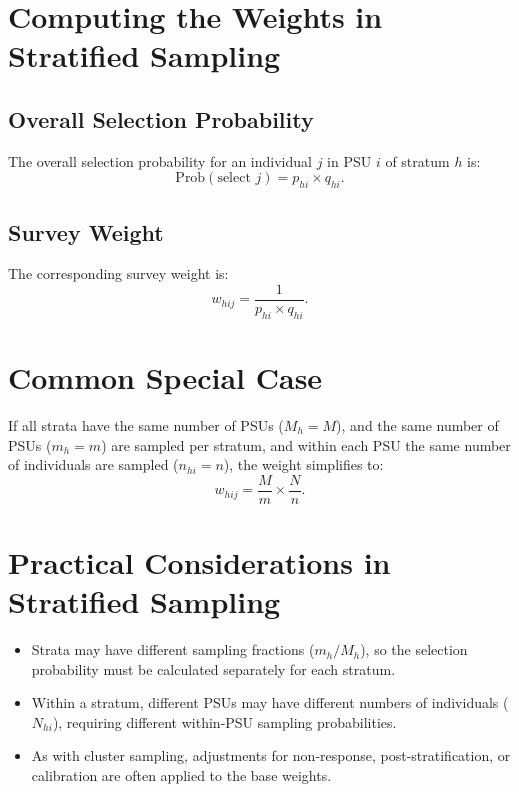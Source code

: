 \documentclass[12pt]{article}
\begin{document}
\section{Computing the Weights in Stratified Sampling}

\subsection{Overall Selection Probability}
The overall selection probability for an individual \( j \) in PSU \( i \) of stratum \( h \) is:
\[
\text{Prob}(\text{select } j) = p_{hi} \times q_{hi}.
\]

\subsection{Survey Weight}
The corresponding survey weight is:
\[
w_{hij} = \frac{1}{p_{hi} \times q_{hi}}.
\]

\section{Common Special Case}
If all strata have the same number of PSUs (\( M_h = M \)), and the same number of PSUs (\( m_h = m \)) are sampled per stratum, and within each PSU the same number of individuals are sampled (\( n_{hi} = n \)), the weight simplifies to:
\[
w_{hij} = \frac{M}{m} \times \frac{N}{n}.
\]

\section{Practical Considerations in Stratified Sampling}
\begin{itemize}
    \item Strata may have different sampling fractions (\( m_h / M_h \)), so the selection probability must be calculated separately for each stratum.
    \item Within a stratum, different PSUs may have different numbers of individuals (\( N_{hi} \)), requiring different within-PSU sampling probabilities.
    \item As with cluster sampling, adjustments for non-response, post-stratification, or calibration are often applied to the base weights.
\end{itemize}
\end{document}
